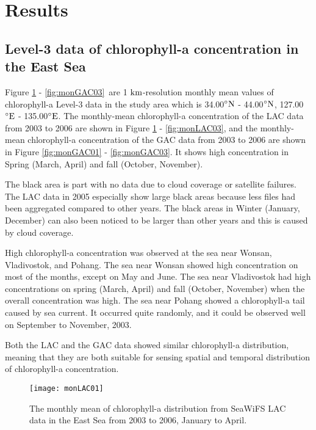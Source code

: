 \section{Results}

\subsection{Level-3 data of chlorophyll-a concentration in the East Sea}

Figure \ref{fig:monLAC01} - \ref{fig:monGAC03}\ are 1 $\rm km$-resolution monthly mean values of chlorophyll-a Level-3 data in the study area which is 34.00$\rm^{\circ}N$ - 44.00$\rm^{\circ}N$, 127.00$\rm^{\circ}E$ - 135.00$\rm^{\circ}E$. The monthly-mean chlorophyll-a concentration of the LAC data from 2003 to 2006 are shown in Figure \ref{fig:monLAC01} - \ref{fig:monLAC03}, and the monthly-mean chlorophyll-a concentration of the GAC data from 2003 to 2006 are shown in Figure \ref{fig:monGAC01} - \ref{fig:monGAC03}. It shows high concentration in Spring (March, April) and fall (October, November).

The black area is part with no data due to cloud coverage or satellite failures. The LAC data in 2005 especially show large black areas because less files had been aggregated compared to other years. The black areas in Winter (January, December) can also been noticed to be larger than other years and this is caused by cloud coverage.

High chlorophyll-a concentration was observed at the sea near Wonsan, Vladivostok, and Pohang. The sea near Wonsan showed high concentration on most of the months, except on May and June. The sea near Vladivostok had high concentrations on spring (March, April) and fall (October, November) when the overall concentration was high. The sea near Pohang showed a chlorophyll-a tail caused by sea current. It occurred quite randomly, and it could be observed well on September to November, 2003. 

Both the LAC and the GAC data showed similar chlorophyll-a distribution, meaning that they are both suitable for sensing spatial and temporal distribution of chlorophyll-a concentration.

\begin{figure}[h]
	\centering
	\texttt{[image: monLAC01]}\\
	\caption{The monthly mean of chlorophyll-a distribution from SeaWiFS LAC data in the East Sea from 2003 to 2006, January to April.}
	\label{fig:monLAC01}
\end{figure}


